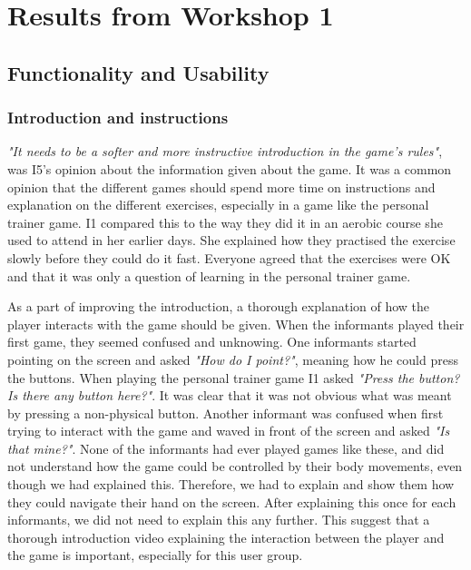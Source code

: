 \chapter{Results from Workshop 1}

\section{Functionality and Usability}
\subsection{Introduction and instructions}
\emph{"It needs to be a softer and more instructive introduction in the game’s rules"}, was I5's opinion about the information given about the game. It was a common opinion that the different games should spend more time on instructions and explanation on the different exercises, especially in a game like the personal trainer game. I1 compared this to the way they did it in an aerobic course she used to attend in her earlier days. She explained how they practised the exercise slowly before they could do it fast. Everyone agreed that the exercises were OK and that it was only a question of learning in the personal trainer game. 

As a part of improving the introduction, a thorough explanation of how the player interacts with the game should be given. When the informants played their first game, they seemed confused and unknowing. One informants started pointing on the screen and asked \emph{"How do I point?"}, meaning how he could press the buttons. When playing the personal trainer game I1 asked \emph{"Press the button? Is there any button here?"}. It was clear that it was not obvious what was meant by pressing a non-physical button. Another informant was confused when first trying to interact with the game and waved in front of the screen and asked \emph{"Is that mine?"}.  None of the informants had ever played games like these, and did not understand how the game could be controlled by their body movements, even though we had explained this. Therefore, we had to explain and show them how they could navigate their hand on the screen. After explaining this once for each informants, we did not need to explain this any further. This suggest that a thorough introduction video explaining the interaction between the player and the game is important, especially for this user group. 

